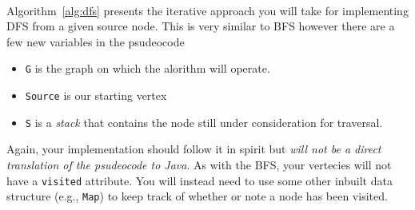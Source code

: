 \vspace{0.25cm}\\

\noindent Algorithm~\ref{alg:dfs} presents the iterative approach you will take
for implementing DFS from a given source node. This is very similar to BFS however there are a few new variables in the psudeocode
\begin{itemize}
    \item \lstinline|G| is the graph on which the alorithm will operate.
    \item \lstinline|Source| is our starting vertex
    \item \lstinline|S| is a \textit{stack} that contains the node still under consideration for traversal.
\end{itemize}

Again, your implementation should follow it in spirit but \textit{will not be a
direct translation of the psudeocode to Java}. As with the BFS, your vertecies
will not have a \lstinline|visited| attribute. You will instead need to use
some other inbuilt data structure (e.g., \lstinline|Map|) to keep track of
whether or note a node has been visited.
